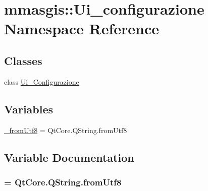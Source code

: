 \hypertarget{namespacemmasgis_1_1Ui__configurazione}{
\section{mmasgis::Ui\_\-configurazione Namespace Reference}
\label{namespacemmasgis_1_1Ui__configurazione}
}
\subsection*{Classes}
\begin{DoxyCompactItemize}
\item 
class \hyperlink{classmmasgis_1_1Ui__configurazione_1_1Ui__Configurazione}{Ui\_\-Configurazione}
\end{DoxyCompactItemize}
\subsection*{Variables}
\begin{DoxyCompactItemize}
\item 
\hyperlink{namespacemmasgis_1_1Ui__configurazione_ac4d24695fd4f4a4111b4bb59a1f76d50}{\_\-fromUtf8} = QtCore.QString.fromUtf8
\end{DoxyCompactItemize}


\subsection{Variable Documentation}
\hypertarget{namespacemmasgis_1_1Ui__configurazione_ac4d24695fd4f4a4111b4bb59a1f76d50}{
\subsubsection[{\_\-fromUtf8}]{ = QtCore.QString.fromUtf8}}
\label{namespacemmasgis_1_1Ui__configurazione_ac4d24695fd4f4a4111b4bb59a1f76d50}
